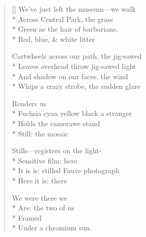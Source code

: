 \label{ch:polaroid}
\settowidth{\versewidth}{Fuchsia   cyan   yellow   black   a stranger}
\begin{verse}[\versewidth]
We've just left the museum---we walk\\*
Across Central Park, the grass\\*
Green as the hair of barbarians.\\*
Red, blue, \& white litter

Cartwheels across our path, the jig-sawed\\*
Leaves overhead throw jig-sawed light\\*
And shadow on our faces, the wind\\*
Whips a crazy strobe, the sudden glare

Renders us\\*
Fuchsia   cyan   yellow   black   a stranger\\*
Holds the camera\qquad we stand\\*
Still: the mosaic

Stills---registers on the light-\\*
Sensitive film: here\\*
It is is: stilled Fauve photograph\\*
Here it is: there

We were there we\\*
Are: the two of us\\*
Framed\\*
Under a chromium sun.
\end{verse}
